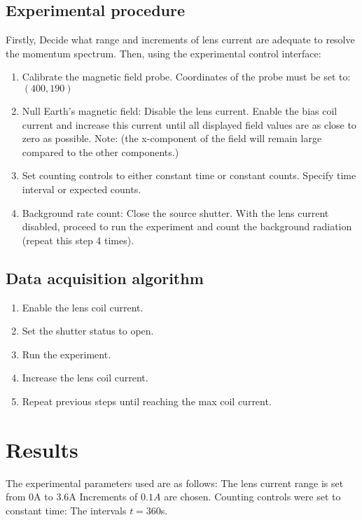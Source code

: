 \documentclass[10pt, a4paper]{article}
\begin{document}
\begin{multicols}{2}
\subsection{Experimental procedure}
Firstly, Decide what range and increments of lens current are adequate to resolve the momentum spectrum.
Then, using the experimental control interface:
\begin{enumerate}
\item Calibrate the magnetic field probe.
    Coordinates of the probe must be set to: $(400,190)$
\item Null Earth's magnetic field:
    Disable the lens current.
    Enable the bias coil current and increase this current until all displayed field values are as close to zero as possible. 
    Note: (the x-component of the field will remain large compared to the other components.)
\item Set counting controls to either constant time or constant counts.
    Specify time interval or expected counts.
\item Background rate count:
    Close the source shutter.
    With the lens current disabled, proceed to run the experiment and count the background radiation (repeat this step 4 times).
\end{enumerate}
\subsection{Data acquisition algorithm}
\begin{enumerate}
\item Enable the lens coil current.    
\item Set the shutter status to open.
\item Run the experiment.
\item Increase the lens coil current.
\item Repeat previous steps until reaching the max coil current.
\end{enumerate}

\section{Results}

The experimental parameters used are as follows:
The lens current range is set from $0$A to $3.6$A
Increments of $0.1A$ are chosen. 
Counting controls were set to constant time: The intervals $t = 360$s.


\end{multicols}
\end{document}
